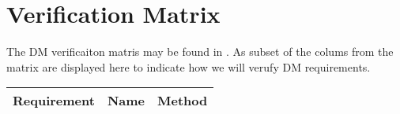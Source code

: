 \section{Verification Matrix} \label{sect:vvm}

The DM verificaiton matris may be found in . As subset of the colums from the matrix are displayed
here to indicate how we will verufy DM requirements.

\small

\begin{longtable}{|l|p{}|l|}
\hline
\textbf{Requirement} & \textbf{Name} &\textbf{Method} \\\hline

\end{longtable}

\normalsize
